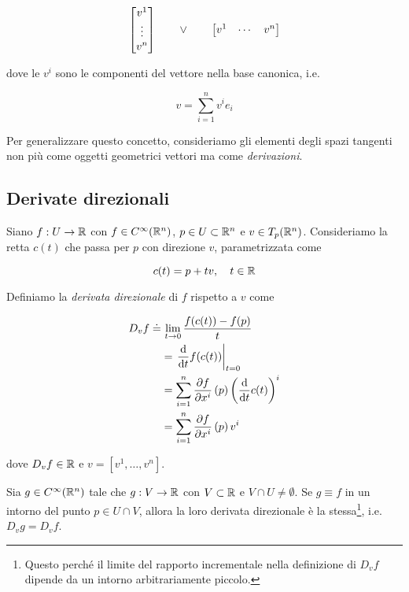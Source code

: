 \begin{equation}
	\bmqty{ v^{1} \\ \vdots \\ v^{n} } \qquad \lor \qquad \bmqty{ v^{1} & \cdots & v^{n} }
\end{equation}

dove le $ v^{i} $ sono le componenti del vettore nella base canonica, i.e.

\begin{equation}
	v = \sum_{i=1}^{n} v^{i} e_{i}
\end{equation}

Per generalizzare questo concetto, consideriamo gli elementi degli spazi tangenti non più come oggetti geometrici vettori ma come \textit{derivazioni}.

\subsection{Derivate direzionali}

Siano $ f : U \to \mathbb{R} $ con $ f \in C^{\infty}(\mathbb{R}^{n}) $, $ p\in U \subset \mathbb{R}^{n} $ e $ v \in T_{p}(\mathbb{R}^{n}) $. Consideriamo la retta $ c(t) $ che passa per $ p $ con direzione $ v $, parametrizzata come

\begin{equation}
	c(t) = p + t v \qcomma t \in \R
\end{equation}

Definiamo la \textit{derivata direzionale} di $ f $ rispetto a $ v $ come

\begin{align}
	\begin{split}
		D_{v} f \doteq& \, \lim_{t \to 0} \dfrac{f(c(t)) - f(p)}{t}\\
		&= \left. \dv{t} f(c(t)) \right|_{t=0}\\
		&= \sum_{i=1}^{n} \pdv{f}{x^{i}} \, (p) \left( \dv{t} c(t) \right)^{i}\\
		&= \sum_{i=1}^{n} \pdv{f}{x^{i}} \, (p) \, v^{i}
	\end{split}
\end{align}

dove $ D_{v} f \in \mathbb{R} $ e $ v = [v^{1},\dots,v^{n}] $.

\begin{remark}
	Sia $ g \in C^{\infty} (\mathbb{R}^{n}) $ tale che $ g : V \to \mathbb{R} $ con $ V \subset \mathbb{R} $ e $ V \cap U \neq \emptyset $. Se $ g \equiv f $ in un intorno del punto $ p \in U \cap V $, allora la loro derivata direzionale è la stessa\footnote{%
		Questo perché il limite del rapporto incrementale nella definizione di $ D_{v} f $ dipende da un intorno arbitrariamente piccolo.%
	}, i.e. $ D_{v} g = D_{v} f $.
\end{remark}

